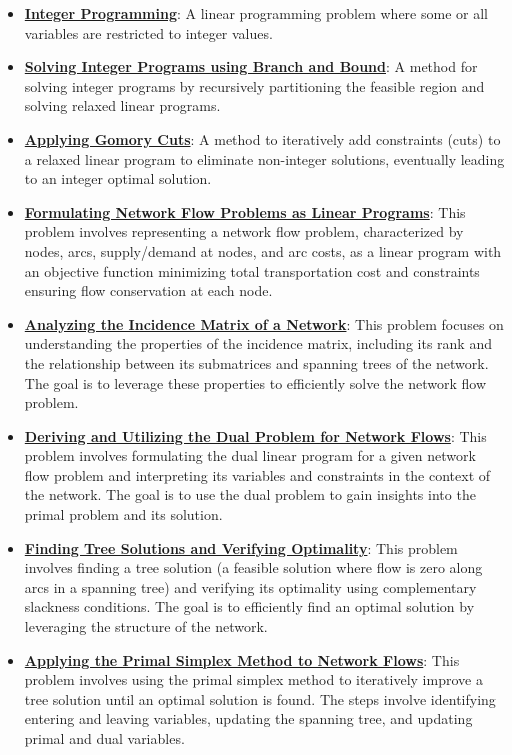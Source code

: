 \documentclass{article}%
\begin{document}
\begin{itemize}[leftmargin=*]%
\item \href{https://www.math.purdue.edu/~yipn/421/2024-10-31-IntLinProg.pdf#page=1}{\textbf{Integer Programming}}: A linear programming problem where some or all variables are restricted to integer values.%
\item \href{https://www.math.purdue.edu/~yipn/421/2024-10-31-IntLinProg.pdf#page=5}{\textbf{Solving Integer Programs using Branch and Bound}}: A method for solving integer programs by recursively partitioning the feasible region and solving relaxed linear programs.%
\item \href{https://www.math.purdue.edu/~yipn/421/2024-10-31-IntLinProg.pdf#page=15}{\textbf{Applying Gomory Cuts}}: A method to iteratively add constraints (cuts) to a relaxed linear program to eliminate non-integer solutions, eventually leading to an integer optimal solution.%
\end{itemize}%
\begin{itemize}[leftmargin=*]%
\item \href{https://www.math.purdue.edu/~yipn/421/2024-11-05-NetFlows.pdf#page=2}{\textbf{Formulating Network Flow Problems as Linear Programs}}: This problem involves representing a network flow problem, characterized by nodes, arcs, supply/demand at nodes, and arc costs, as a linear program with an objective function minimizing total transportation cost and constraints ensuring flow conservation at each node.%
\item \href{https://www.math.purdue.edu/~yipn/421/2024-11-05-NetFlows.pdf#page=5}{\textbf{Analyzing the Incidence Matrix of a Network}}: This problem focuses on understanding the properties of the incidence matrix, including its rank and the relationship between its submatrices and spanning trees of the network. The goal is to leverage these properties to efficiently solve the network flow problem.%
\item \href{https://www.math.purdue.edu/~yipn/421/2024-11-05-NetFlows.pdf#page=7}{\textbf{Deriving and Utilizing the Dual Problem for Network Flows}}: This problem involves formulating the dual linear program for a given network flow problem and interpreting its variables and constraints in the context of the network. The goal is to use the dual problem to gain insights into the primal problem and its solution.%
\item \href{https://www.math.purdue.edu/~yipn/421/2024-11-05-NetFlows.pdf#page=10}{\textbf{Finding Tree Solutions and Verifying Optimality}}: This problem involves finding a tree solution (a feasible solution where flow is zero along arcs in a spanning tree) and verifying its optimality using complementary slackness conditions. The goal is to efficiently find an optimal solution by leveraging the structure of the network.%
\item \href{https://www.math.purdue.edu/~yipn/421/2024-11-05-NetFlows.pdf#page=22}{\textbf{Applying the Primal Simplex Method to Network Flows}}: This problem involves using the primal simplex method to iteratively improve a tree solution until an optimal solution is found. The steps involve identifying entering and leaving variables, updating the spanning tree, and updating primal and dual variables.%
\end{itemize}%
\end{document}
